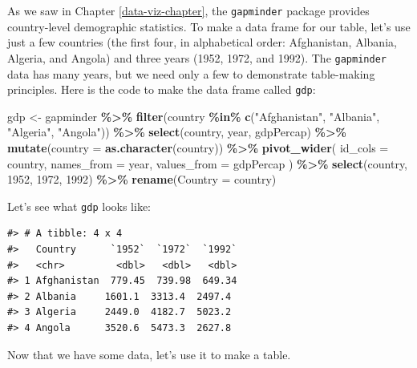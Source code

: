 \documentclass[
]{book}
\newenvironment{Shaded}{\begin{snugshade}}{\end{snugshade}}
\newcommand{\AttributeTok}[1]{\textcolor[rgb]{0.13,0.29,0.53}{#1}}
\newcommand{\FunctionTok}[1]{\textcolor[rgb]{0.13,0.29,0.53}{\textbf{#1}}}
\newcommand{\NormalTok}[1]{#1}
\newcommand{\OtherTok}[1]{\textcolor[rgb]{0.56,0.35,0.01}{#1}}
\newcommand{\SpecialCharTok}[1]{\textcolor[rgb]{0.81,0.36,0.00}{\textbf{#1}}}
\newcommand{\StringTok}[1]{\textcolor[rgb]{0.31,0.60,0.02}{#1}}
\begin{document}
As we saw in Chapter \ref{data-viz-chapter}, the \texttt{gapminder} package provides country-level demographic statistics. To make a data frame for our table, let's use just a few countries (the first four, in alphabetical order: Afghanistan, Albania, Algeria, and Angola) and three years (1952, 1972, and 1992). The \texttt{gapminder} data has many years, but we need only a few to demonstrate table-making principles. Here is the code to make the data frame called \texttt{gdp}:

\begin{Shaded}
\begin{Highlighting}[]
\NormalTok{gdp }\OtherTok{\textless{}{-}}\NormalTok{ gapminder }\SpecialCharTok{\%\textgreater{}\%}
  \FunctionTok{filter}\NormalTok{(country }\SpecialCharTok{\%in\%} \FunctionTok{c}\NormalTok{(}\StringTok{"Afghanistan"}\NormalTok{, }\StringTok{"Albania"}\NormalTok{, }\StringTok{"Algeria"}\NormalTok{, }\StringTok{"Angola"}\NormalTok{)) }\SpecialCharTok{\%\textgreater{}\%}
  \FunctionTok{select}\NormalTok{(country, year, gdpPercap) }\SpecialCharTok{\%\textgreater{}\%}
  \FunctionTok{mutate}\NormalTok{(}\AttributeTok{country =} \FunctionTok{as.character}\NormalTok{(country)) }\SpecialCharTok{\%\textgreater{}\%}
  \FunctionTok{pivot\_wider}\NormalTok{(}
    \AttributeTok{id\_cols =}\NormalTok{ country,}
    \AttributeTok{names\_from =}\NormalTok{ year,}
    \AttributeTok{values\_from =}\NormalTok{ gdpPercap}
\NormalTok{  ) }\SpecialCharTok{\%\textgreater{}\%}
  \FunctionTok{select}\NormalTok{(country, }\StringTok{\textasciigrave{}}\AttributeTok{1952}\StringTok{\textasciigrave{}}\NormalTok{, }\StringTok{\textasciigrave{}}\AttributeTok{1972}\StringTok{\textasciigrave{}}\NormalTok{, }\StringTok{\textasciigrave{}}\AttributeTok{1992}\StringTok{\textasciigrave{}}\NormalTok{) }\SpecialCharTok{\%\textgreater{}\%}
  \FunctionTok{rename}\NormalTok{(}\AttributeTok{Country =}\NormalTok{ country)}
\end{Highlighting}
\end{Shaded}

Let's see what \texttt{gdp} looks like:

\begin{verbatim}
#> # A tibble: 4 x 4
#>   Country      `1952`  `1972`  `1992`
#>   <chr>         <dbl>   <dbl>   <dbl>
#> 1 Afghanistan  779.45  739.98  649.34
#> 2 Albania     1601.1  3313.4  2497.4 
#> 3 Algeria     2449.0  4182.7  5023.2 
#> 4 Angola      3520.6  5473.3  2627.8
\end{verbatim}

Now that we have some data, let's use it to make a table.
\end{document}
